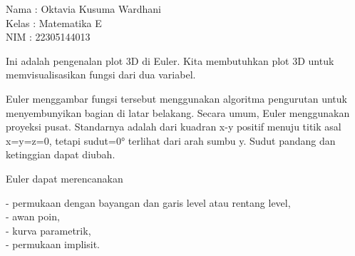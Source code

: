 \documentclass{article}
\begin{document}
\begin{eulernotebook}
\begin{eulercomment}
Nama  : Oktavia Kusuma Wardhani\\
Kelas : Matematika E\\
NIM   : 22305144013

\end{eulercomment}
\eulersubheading{}
\begin{eulercomment}
Ini adalah pengenalan plot 3D di Euler. Kita membutuhkan plot 3D untuk
memvisualisasikan fungsi dari dua variabel.

Euler menggambar fungsi tersebut menggunakan algoritma pengurutan
untuk menyembunyikan bagian di latar belakang. Secara umum, Euler
menggunakan proyeksi pusat. Standarnya adalah dari kuadran x-y positif
menuju titik asal x=y=z=0, tetapi sudut=0° terlihat dari arah sumbu y.
Sudut pandang dan ketinggian dapat diubah.

Euler dapat merencanakan

- permukaan dengan bayangan dan garis level atau rentang level,\\
- awan poin,\\
- kurva parametrik,\\
- permukaan implisit.


\end{eulercomment}
\end{eulernotebook}
\end{document}
